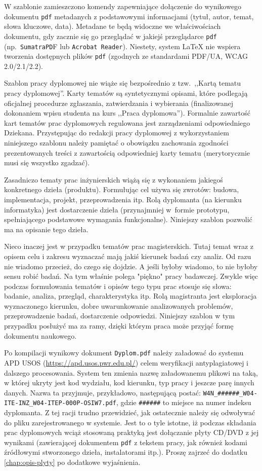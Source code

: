 W szablonie zamieszczono komendy zapewniające dołączenie  do wynikowego dokumentu \texttt{pdf} metadanych z podstawowymi informacjami (tytuł, autor, temat, słowa kluczowe, data). Metadane te będą widoczne we właściwościach dokumentu, gdy zacznie się go przeglądać w jakiejś przeglądarce \texttt{pdf} (np.~\texttt{SumatraPD}F lub \texttt{Acrobat Reader}). Niestety, system \LaTeX{} nie wspiera tworzenia dostępnych plików \texttt{pdf} (zgodnych ze standardami PDF/UA, WCAG 2.0/2.1/2.2).

Szablon pracy dyplomowej nie wiąże się bezpośrednio z tzw.\ ,,Kartą tematu pracy dyplomowej''. Karty tematów są syntetycznymi opisami, które podlegają oficjalnej procedurze zgłaszania, zatwierdzania i wybierania (finalizowanej dokonaniem wpisu studenta na kurs ,,Praca dyplomowa''). Formalnie zawartość kart tematów prac dyplomowych regulowana jest zarządzeniami odpowiedniego Dziekana. Przystępując do redakcji pracy dyplomowej z wykorzystaniem niniejszego szablonu należy pamiętać o obowiązku zachowania zgodności prezentowanych treści z zawartością odpowiedniej karty tematu (merytorycznie musi się wszystko zgadzać).

Zasadniczo tematy prac inżynierskich wiążą się z wykonaniem jakiegoś konkretnego dzieła (produktu). Formułując cel używa się zwrotów:
budowa, implementacja, projekt, przeprowadzenia itp. Rolą dyplomanta (na kierunku informatyka) jest dostarczenie dzieła (przynajmniej w~formie prototypu, spełniającego podstawowe wymagania funkcjonalne). Niniejszy szablon pozwolić ma na opisanie tego dzieła.

Nieco inaczej jest w przypadku tematów prac magisterskich. Tutaj temat wraz z opisem celu i zakresu wyznaczać mają jakiś kierunek badań czy analiz. Od razu nie wiadomo przecież, do czego się dojdzie. A jeśli byłoby wiadomo, to nie byłoby sensu robić badań.  Na tym właśnie polega "piękno" pracy badawczej. 
Zwykle więc podczas formułowania tematów i opisów tego typu prac stosuje się słowa: badanie, analiza, przegląd, charakterystyka itp. Rolą magistranta jest eksploracja wyznaczonego kierunku, dobre uwarunkowanie analizowanych problemów, przeprowadzenie badań, dostarczenie odpowiedzi. Niniejszy szablon w tym przypadku posłużyć ma za ramy, dzięki którym praca może przyjąć formę dokumentu naukowego.

Po kompilacji wynikowy dokument \texttt{Dyplom.pdf} należy załadować do systemu APD USOS (\url{https://apd.usos.pwr.edu.pl/}) celem weryfikacji antyplagiatowej i dalszego procesowania. System ten zmienia nazwę załadowanemu plikowi na taką, w której ukryty jest kod wydziału, kod kierunku, typ pracy i jeszcze parę innych danych. Nazwa ta przyjmuje, przykładowo, następującą postać: \texttt{W4N\_\#\#\#\#\#\#\_W04-ITE-INZ\_W04-ITEP-000P-OSIW7.pdf}, gdzie \texttt{\#\#\#\#\#\#} to miejsce na numer indeksu dyplomanta. Z tej racji trudno przewidzieć, jak ostatecznie należy się odwoływać do pliku zarejestrowanego w systemie. Jest to o tyle istotne, iż podczas składania prac dyplomowych wciąż stosowaną praktyką jest dołączanie płyty CD/DVD z jej wynikami (zawierającej dokumentem \texttt{pdf} z tekstem pracy, jak również kodami źródłowymi stworzonego dzieła, instalatorami itp.). Proszę zajrzeć do dodatku \ref{chap:opis-plyty} po dodatkowe wyjaśnienia.

